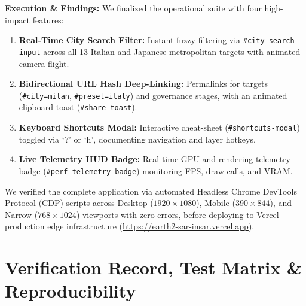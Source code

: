 \documentclass[10pt,twocolumn,letterpaper]{article}
\begin{document}
\textbf{Execution \& Findings:} We finalized the operational suite with four high-impact features:
\begin{enumerate}[leftmargin=*,noitemsep,topsep=1pt]
    \item \textbf{Real-Time City Search Filter:} Instant fuzzy filtering via \texttt{\#city-search-input} across all 13 Italian and Japanese metropolitan targets with animated camera flight.
    \item \textbf{Bidirectional URL Hash Deep-Linking:} Permalinks for targets (\texttt{\#city=milan}, \texttt{\#preset=italy}) and governance stages, with an animated clipboard toast (\texttt{\#share-toast}).
    \item \textbf{Keyboard Shortcuts Modal:} Interactive cheat-sheet (\texttt{\#shortcuts-modal}) toggled via `?' or `h', documenting navigation and layer hotkeys.
    \item \textbf{Live Telemetry HUD Badge:} Real-time GPU and rendering telemetry badge (\texttt{\#perf-telemetry-badge}) monitoring FPS, draw calls, and VRAM.
\end{enumerate}
We verified the complete application via automated Headless Chrome DevTools Protocol (CDP) scripts across Desktop ($1920 \times 1080$), Mobile ($390 \times 844$), and Narrow ($768 \times 1024$) viewports with zero errors, before deploying to Vercel production edge infrastructure (\url{https://earth2-sar-insar.vercel.app}).

\section{Verification Record, Test Matrix \& Reproducibility}
\end{document}
